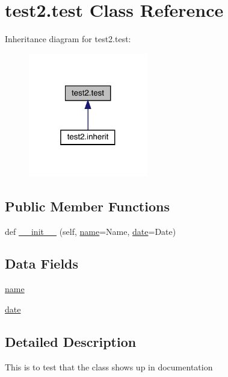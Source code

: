 \hypertarget{classtest2_1_1test}{}\section{test2.\+test Class Reference}
\label{classtest2_1_1test}


Inheritance diagram for test2.\+test\+:
\nopagebreak
\begin{figure}[H]
\begin{center}
\leavevmode
\includegraphics[width=148pt]{classtest2_1_1test__inherit__graph}
\end{center}
\end{figure}
\subsection*{Public Member Functions}
\begin{DoxyCompactItemize}
\item 
def \mbox{\hyperlink{classtest2_1_1test_aa61f121f89d9b8e4d6ee2e28908a4719}{\+\_\+\+\_\+init\+\_\+\+\_\+}} (self, \mbox{\hyperlink{classtest2_1_1test_afed0734169aa1b3cb3291c0a55acc134}{name}}=\textquotesingle{}Name\textquotesingle{}, \mbox{\hyperlink{classtest2_1_1test_a1fb510bf063d6341ec863dd1fd9b9e54}{date}}=\textquotesingle{}Date\textquotesingle{})
\end{DoxyCompactItemize}
\subsection*{Data Fields}
\begin{DoxyCompactItemize}
\item 
\mbox{\hyperlink{classtest2_1_1test_afed0734169aa1b3cb3291c0a55acc134}{name}}
\item 
\mbox{\hyperlink{classtest2_1_1test_a1fb510bf063d6341ec863dd1fd9b9e54}{date}}
\end{DoxyCompactItemize}


\subsection{Detailed Description}
\begin{DoxyVerb}This is to test that the class shows up in documentation \end{DoxyVerb}
 

